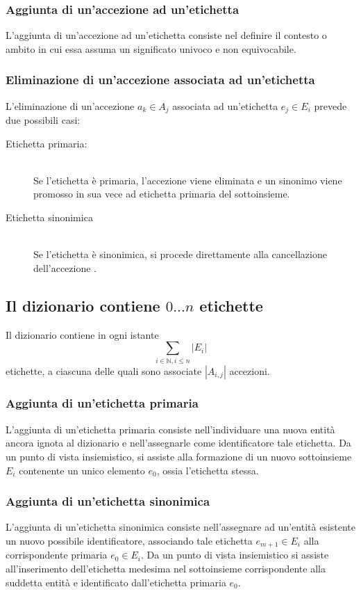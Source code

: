 \documentclass[10pt,a4paper,headinclude,footinclude,hidelinks]{scrreprt} %
\begin{document}
	\subsubsection{Aggiunta di un'accezione ad un'etichetta}
	L'aggiunta di un'accezione ad un'etichetta consiste nel definire il contesto o ambito in cui essa assuma un significato univoco e non equivocabile.

	\subsubsection{Eliminazione di un'accezione associata ad un'etichetta}
	L'eliminazione di un'accezione $a_k \in A_j$ associata ad un'etichetta $e_j \in E_i$ prevede due possibili casi:
	\begin{description}
	\item[Etichetta primaria:] \hfill \\
	Se l'etichetta è primaria, l'accezione viene eliminata e un sinonimo viene promosso in sua vece ad etichetta primaria del sottoinsieme.
 	\item[Etichetta sinonimica] \hfill \\
	Se l'etichetta è sinonimica, si procede direttamente alla cancellazione dell'accezione	.
	\end{description}

	\subsection[Dizionario]{Il dizionario contiene $0...n$ etichette}
	Il dizionario contiene in ogni istante $$\sum_{i \in \mathbb{N}, i \leq n}\left|E_i\right|$$ etichette, a ciascuna delle quali sono associate $\left|A_{i,j}\right|$ accezioni.

	\subsubsection{Aggiunta di un'etichetta primaria}
	L'aggiunta di un'etichetta primaria consiste nell'individuare una nuova entità ancora ignota al dizionario e nell'assegnarle come identificatore tale etichetta. Da un punto di vista insiemistico, si assiste alla formazione di un nuovo sottoinsieme $E_i$ contenente un unico elemento $e_0$, ossia l'etichetta stessa.
	
	\subsubsection{Aggiunta di un'etichetta sinonimica}
	L'aggiunta di un'etichetta sinonimica consiste nell'assegnare ad un'entità esistente un nuovo possibile identificatore, associando tale etichetta $e_{m+1} \in E_i$ alla corrispondente primaria $e_0 \in E_i$. Da un punto di vista insiemistico si assiste all'inserimento dell'etichetta medesima nel sottoinsieme corrispondente alla suddetta entità e identificato dall'etichetta primaria $e_0$.
\end{document}
